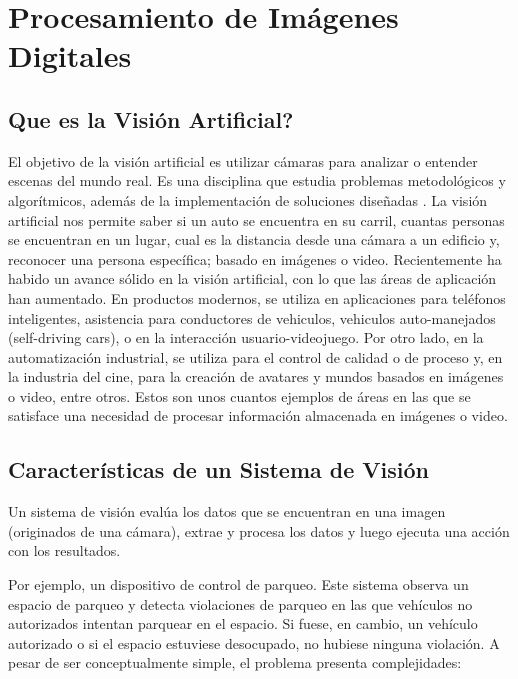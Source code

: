 \chapter{Procesamiento de Imágenes Digitales}

\section{Que es la Visión Artificial?}
El objetivo de la visión artificial es utilizar cámaras para analizar o entender escenas del mundo real. Es una disciplina que estudia problemas metodológicos y algorítmicos, además de la implementación de soluciones diseñadas \cite{Klette2014-oo}.
La visión artificial nos permite saber si un auto se encuentra en su carril, cuantas personas se encuentran en un lugar, cual es la distancia desde una cámara a un edificio y, reconocer una persona específica; basado en imágenes o video.
Recientemente ha habido un avance sólido en la visión artificial, con lo que las áreas de aplicación han aumentado. En productos modernos, se utiliza en aplicaciones para teléfonos inteligentes, asistencia para conductores de vehiculos, vehiculos auto-manejados (self-driving cars), o en la interacción usuario-videojuego.  Por otro lado, en la automatización industrial, se utiliza para el control de calidad o de proceso y, en la industria del cine, para la creación de avatares y mundos basados en imágenes o video, entre otros.  Estos son unos cuantos ejemplos de áreas en las que se satisface una necesidad de procesar información almacenada en imágenes o video. 


\section{Características de un Sistema de Visión}
Un sistema de visión evalúa los datos que se encuentran en una imagen (originados de una cámara), extrae y procesa los datos y luego ejecuta una acción con los resultados.

Por ejemplo, un dispositivo de control de parqueo. Este sistema observa un espacio de parqueo y detecta violaciones de parqueo en las que vehículos no autorizados intentan parquear en el espacio. Si fuese, en cambio, un vehículo autorizado o si el espacio estuviese desocupado, no hubiese ninguna violación. A pesar de ser conceptualmente simple, el problema presenta complejidades:

